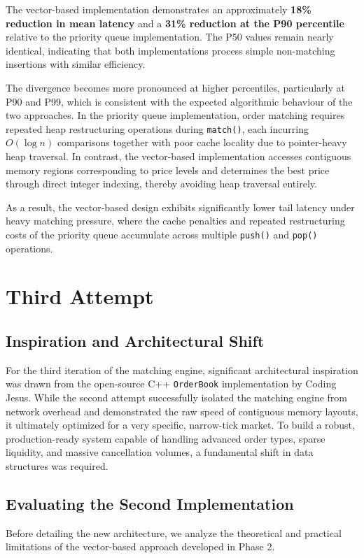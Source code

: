 \documentclass{article}
\begin{document}
The vector-based implementation demonstrates an approximately \textbf{18\% reduction in mean latency} and a \textbf{31\% reduction at the P90 percentile} relative to the priority queue implementation. The P50 values remain nearly identical, indicating that both implementations process simple non-matching insertions with similar efficiency. 

The divergence becomes more pronounced at higher percentiles, particularly at P90 and P99, which is consistent with the expected algorithmic behaviour of the two approaches. In the priority queue implementation, order matching requires repeated heap restructuring operations during \texttt{match()}, each incurring $O(\log n)$ comparisons together with poor cache locality due to pointer-heavy heap traversal. In contrast, the vector-based implementation accesses contiguous memory regions corresponding to price levels and determines the best price through direct integer indexing, thereby avoiding heap traversal entirely.

As a result, the vector-based design exhibits significantly lower tail latency under heavy matching pressure, where the cache penalties and repeated restructuring costs of the priority queue accumulate across multiple \texttt{push()} and \texttt{pop()} operations.



\section{Third Attempt}

\subsection{Inspiration and Architectural Shift}
For the third iteration of the matching engine, significant architectural inspiration was drawn from the open-source C++ \texttt{OrderBook} implementation by Coding Jesus. While the second attempt successfully isolated the matching engine from network overhead and demonstrated the raw speed of contiguous memory layouts, it ultimately optimized for a very specific, narrow-tick market. To build a robust, production-ready system capable of handling advanced order types, sparse liquidity, and massive cancellation volumes, a fundamental shift in data structures was required.

\subsection{Evaluating the Second Implementation}
Before detailing the new architecture, we analyze the theoretical and practical limitations of the vector-based approach developed in Phase 2.
\end{document}
